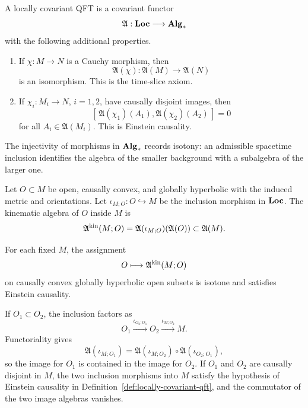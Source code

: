 \begin{definition}
\label{def:locally-covariant-qft}
A locally covariant QFT is a covariant functor
\[
  \mathfrak A:{\bf Loc}\longrightarrow{\bf Alg}_*
\]
with the following additional properties.

\begin{enumerate}[label=(\roman*)]
\item If \(\chi:M\to N\) is a Cauchy morphism, then
\[
  \mathfrak A(\chi):\mathfrak A(M)\longrightarrow\mathfrak A(N)
\]
is an isomorphism.  This is the time-slice axiom.

\item If \(\chi_i:M_i\to N\), \(i=1,2\), have causally disjoint images, then
\[
  [\,\mathfrak A(\chi_1)(A_1),\mathfrak A(\chi_2)(A_2)\,]=0
\]
for all \(A_i\in\mathfrak A(M_i)\).  This is Einstein causality.
\end{enumerate}
\end{definition}

The injectivity of morphisms in \({\bf Alg}_*\) records isotony: an
admissible spacetime inclusion identifies the algebra of the smaller
background with a subalgebra of the larger one.

\begin{definition}
\label{def:kinematic-local-algebra}
Let \(O\subset M\) be open, causally convex, and globally hyperbolic with
the induced metric and orientations.  Let
\(\iota_{M;O}:O\hookrightarrow M\) be the inclusion morphism in
\({\bf Loc}\).  The kinematic algebra of \(O\) inside \(M\) is
\[
  \mathfrak A^{\rm kin}(M;O)
  =
  \mathfrak A(\iota_{M;O})(\mathfrak A(O))
  \subset \mathfrak A(M).
\]
\end{definition}

\begin{remark}
\label{rem:kinematic-net-from-lcqft}
For each fixed \(M\), the assignment
\[
  O\longmapsto \mathfrak A^{\rm kin}(M;O)
\]
on causally convex globally hyperbolic open subsets is isotone and satisfies
Einstein causality.
\end{remark}

If \(O_1\subset O_2\), the inclusion factors as
\[
  O_1\stackrel{\iota_{O_2;O_1}}{\longrightarrow}O_2
  \stackrel{\iota_{M;O_2}}{\longrightarrow}M .
\]
Functoriality gives
\[
  \mathfrak A(\iota_{M;O_1})
  =
  \mathfrak A(\iota_{M;O_2})\circ
  \mathfrak A(\iota_{O_2;O_1}),
\]
so the image for \(O_1\) is contained in the image for \(O_2\).  If
\(O_1\) and \(O_2\) are causally disjoint in \(M\), the two inclusion
morphisms into \(M\) satisfy the hypothesis of Einstein causality in
Definition~\ref{def:locally-covariant-qft}, and the commutator of the two
image algebras vanishes.

